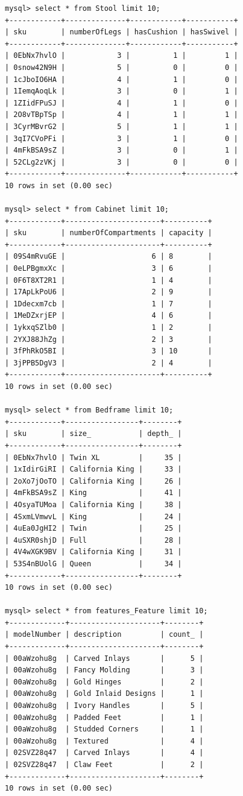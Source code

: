 \documentclass[american,extrafontsizes,12pt,portrait,letterpaper,oneside,onecolumn,final]{memoir}
\begin{document}
\begin{verbatim}
mysql> select * from Stool limit 10;
+------------+--------------+------------+-----------+
| sku        | numberOfLegs | hasCushion | hasSwivel |
+------------+--------------+------------+-----------+
| 0EbNx7hvlO |            3 |          1 |         1 |
| 0snow42N9H |            5 |          0 |         0 |
| 1cJboIO6HA |            4 |          1 |         0 |
| 1IemqAoqLk |            3 |          0 |         1 |
| 1ZIidFPuSJ |            4 |          1 |         0 |
| 2O8vTBpTSp |            4 |          1 |         1 |
| 3CyrMBvrG2 |            5 |          1 |         1 |
| 3qI7CVoPFi |            3 |          1 |         0 |
| 4mFkBSA9sZ |            3 |          0 |         1 |
| 52CLg2zVKj |            3 |          0 |         0 |
+------------+--------------+------------+-----------+
10 rows in set (0.00 sec)

mysql> select * from Cabinet limit 10;
+------------+----------------------+----------+
| sku        | numberOfCompartments | capacity |
+------------+----------------------+----------+
| 09S4mRvuGE |                    6 | 8        |
| 0eLPBgmxXc |                    3 | 6        |
| 0F6T8XT2R1 |                    1 | 4        |
| 17ApLkPoU6 |                    2 | 9        |
| 1Ddecxm7cb |                    1 | 7        |
| 1MeDZxrjEP |                    4 | 6        |
| 1ykxqSZlb0 |                    1 | 2        |
| 2YXJ88JhZg |                    2 | 3        |
| 3fPhRkO5BI |                    3 | 10       |
| 3jPPB5DgV3 |                    2 | 4        |
+------------+----------------------+----------+
10 rows in set (0.00 sec)

mysql> select * from Bedframe limit 10;
+------------+-----------------+--------+
| sku        | size_           | depth_ |
+------------+-----------------+--------+
| 0EbNx7hvlO | Twin XL         |     35 |
| 1xIdirGiRI | California King |     33 |
| 2oXo7jOoTO | California King |     26 |
| 4mFkBSA9sZ | King            |     41 |
| 4OsyaTUMoa | California King |     38 |
| 4SxmLVmwvL | King            |     24 |
| 4uEa0JgHI2 | Twin            |     25 |
| 4uSXR0shjD | Full            |     28 |
| 4V4wXGK9BV | California King |     31 |
| 53S4nBUolG | Queen           |     34 |
+------------+-----------------+--------+
10 rows in set (0.00 sec)

mysql> select * from features_Feature limit 10;
+-------------+---------------------+--------+
| modelNumber | description         | count_ |
+-------------+---------------------+--------+
| 00aWzohu8g  | Carved Inlays       |      5 |
| 00aWzohu8g  | Fancy Molding       |      3 |
| 00aWzohu8g  | Gold Hinges         |      2 |
| 00aWzohu8g  | Gold Inlaid Designs |      1 |
| 00aWzohu8g  | Ivory Handles       |      5 |
| 00aWzohu8g  | Padded Feet         |      1 |
| 00aWzohu8g  | Studded Corners     |      1 |
| 00aWzohu8g  | Textured            |      4 |
| 02SVZ28q47  | Carved Inlays       |      4 |
| 02SVZ28q47  | Claw Feet           |      2 |
+-------------+---------------------+--------+
10 rows in set (0.00 sec)
\end{verbatim}
\end{document}
